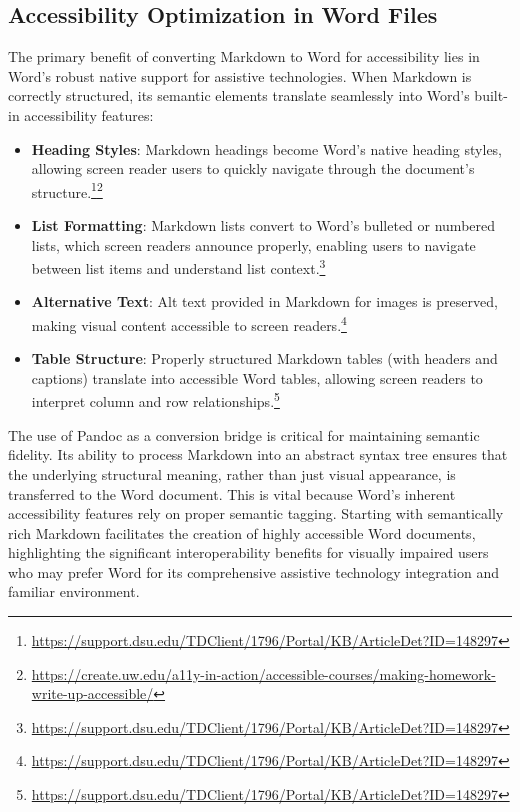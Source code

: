 \subsection{Accessibility Optimization in Word Files}
The primary benefit of converting Markdown to Word for accessibility lies in Word's robust native support for assistive technologies. When Markdown is correctly structured, its semantic elements translate seamlessly into Word's built-in accessibility features:
\begin{itemize}[noitemsep,topsep=0pt]
    \item \textbf{Heading Styles}: Markdown headings become Word's native heading styles, allowing screen reader users to quickly navigate through the document's structure.\footnote{\url{https://support.dsu.edu/TDClient/1796/Portal/KB/ArticleDet?ID=148297}}\footnote{\url{https://create.uw.edu/a11y-in-action/accessible-courses/making-homework-write-up-accessible/}}
    \item \textbf{List Formatting}: Markdown lists convert to Word's bulleted or numbered lists, which screen readers announce properly, enabling users to navigate between list items and understand list context.\footnote{\url{https://support.dsu.edu/TDClient/1796/Portal/KB/ArticleDet?ID=148297}}
    \item \textbf{Alternative Text}: Alt text provided in Markdown for images is preserved, making visual content accessible to screen readers.\footnote{\url{https://support.dsu.edu/TDClient/1796/Portal/KB/ArticleDet?ID=148297}}
    \item \textbf{Table Structure}: Properly structured Markdown tables (with headers and captions) translate into accessible Word tables, allowing screen readers to interpret column and row relationships.\footnote{\url{https://support.dsu.edu/TDClient/1796/Portal/KB/ArticleDet?ID=148297}}
\end{itemize}
The use of Pandoc as a conversion bridge is critical for maintaining semantic fidelity. Its ability to process Markdown into an abstract syntax tree ensures that the underlying structural meaning, rather than just visual appearance, is transferred to the Word document. This is vital because Word's inherent accessibility features rely on proper semantic tagging. Starting with semantically rich Markdown facilitates the creation of highly accessible Word documents, highlighting the significant interoperability benefits for visually impaired users who may prefer Word for its comprehensive assistive technology integration and familiar environment.

